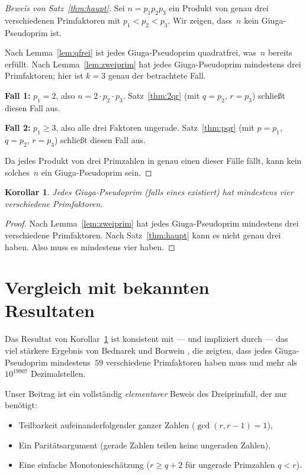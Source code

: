 \documentclass[12pt,a4paper]{amsart}
\newtheorem{corollary}[theorem]{Korollar}
\theoremstyle{definition}
\begin{document}
\begin{proof}[Beweis von Satz~\ref{thm:haupt}]
Sei $n = p_1 p_2 p_3$ ein Produkt von genau drei verschiedenen Primfaktoren
mit $p_1 < p_2 < p_3$. Wir zeigen, dass~$n$ kein Giuga-Pseudoprim ist.

Nach Lemma~\ref{lem:qfrei} ist jedes Giuga-Pseudoprim quadratfrei, was~$n$ bereits
erfüllt. Nach Lemma~\ref{lem:zweiprim} hat jedes Giuga-Pseudoprim mindestens drei
Primfaktoren; hier ist $k = 3$ genau der betrachtete Fall.

\textbf{Fall 1:} $p_1 = 2$, also $n = 2 \cdot p_2 \cdot p_3$.
Satz~\ref{thm:2qr} (mit $q = p_2$, $r = p_3$) schließt diesen Fall aus.

\textbf{Fall 2:} $p_1 \ge 3$, also alle drei Faktoren ungerade.
Satz~\ref{thm:pqr} (mit $p = p_1$, $q = p_2$, $r = p_3$) schließt diesen Fall aus.

Da jedes Produkt von drei Primzahlen in genau einen dieser Fälle fällt,
kann kein solches~$n$ ein Giuga-Pseudoprim sein.
\end{proof}

\begin{corollary}
\label{cor:vierprim}
Jedes Giuga-Pseudoprim (falls eines existiert) hat mindestens \emph{vier}
verschiedene Primfaktoren.
\end{corollary}

\begin{proof}
Nach Lemma~\ref{lem:zweiprim} hat jedes Giuga-Pseudoprim mindestens drei
verschiedene Primfaktoren. Nach Satz~\ref{thm:haupt} kann es nicht genau drei haben.
Also muss es mindestens vier haben.
\end{proof}

\section{Vergleich mit bekannten Resultaten}

Das Resultat von Korollar~\ref{cor:vierprim} ist konsistent mit — und impliziert durch —
das viel stärkere Ergebnis von Bednarek und Borwein \cite{Bednarek2014}, die zeigten,
dass jedes Giuga-Pseudoprim mindestens~$59$ verschiedene Primfaktoren haben muss
und mehr als $10^{19907}$ Dezimalstellen.

Unser Beitrag ist ein vollständig \emph{elementarer} Beweis des Dreiprimfall,
der nur benötigt:
\begin{itemize}
  \item Teilbarkeit aufeinanderfolgender ganzer Zahlen ($\gcd(r, r-1) = 1$),
  \item Ein Paritätsargument (gerade Zahlen teilen keine ungeraden Zahlen),
  \item Eine einfache Monotonieschätzung ($r \ge q + 2$ für ungerade Primzahlen $q < r$).
\end{itemize}
\end{document}
